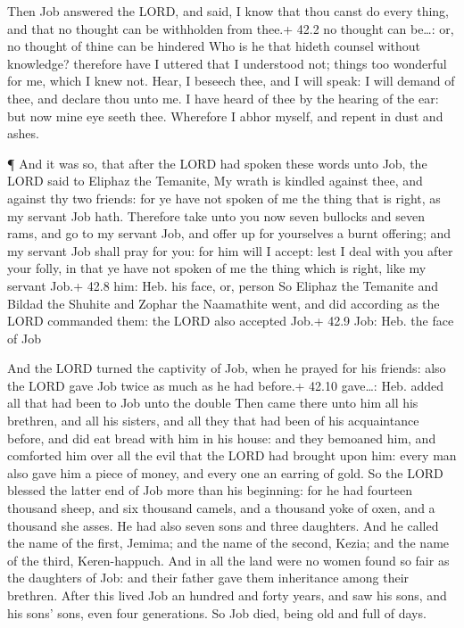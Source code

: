  Then Job answered the LORD, and said,  I know
that thou canst do every thing, and that no thought can be withholden
from thee.+ 42.2 no thought can be\ldots: or, no thought of thine can be
hindered  Who is he that hideth counsel without knowledge?
therefore have I uttered that I understood not; things too wonderful for
me, which I knew not.  Hear, I beseech thee, and I will
speak: I will demand of thee, and declare thou unto me.  I
have heard of thee by the hearing of the ear: but now mine eye seeth
thee.  Wherefore I abhor myself, and repent in dust and
ashes.

 ¶ And it was so, that after the LORD had spoken these words
unto Job, the LORD said to Eliphaz the Temanite, My wrath is kindled
against thee, and against thy two friends: for ye have not spoken of me
the thing that is right, as my servant Job hath.  Therefore
take unto you now seven bullocks and seven rams, and go to my servant
Job, and offer up for yourselves a burnt offering; and my servant Job
shall pray for you: for him will I accept: lest I deal with you after
your folly, in that ye have not spoken of me the thing which is right,
like my servant Job.+ 42.8 him: Heb. his face, or, person 
So Eliphaz the Temanite and Bildad the Shuhite and Zophar the Naamathite
went, and did according as the LORD commanded them: the LORD also
accepted Job.+ 42.9 Job: Heb. the face of Job

 And the LORD turned the captivity of Job, when he prayed
for his friends: also the LORD gave Job twice as much as he had before.+
42.10 gave\ldots: Heb. added all that had been to Job unto the double
 Then came there unto him all his brethren, and all his
sisters, and all they that had been of his acquaintance before, and did
eat bread with him in his house: and they bemoaned him, and comforted
him over all the evil that the LORD had brought upon him: every man also
gave him a piece of money, and every one an earring of gold.
 So the LORD blessed the latter end of Job more than his
beginning: for he had fourteen thousand sheep, and six thousand camels,
and a thousand yoke of oxen, and a thousand she asses.  He
had also seven sons and three daughters.  And he called the
name of the first, Jemima; and the name of the second, Kezia; and the
name of the third, Keren-happuch.  And in all the land were
no women found so fair as the daughters of Job: and their father gave
them inheritance among their brethren.  After this lived
Job an hundred and forty years, and saw his sons, and his sons' sons,
even four generations.  So Job died, being old and full of
days.
